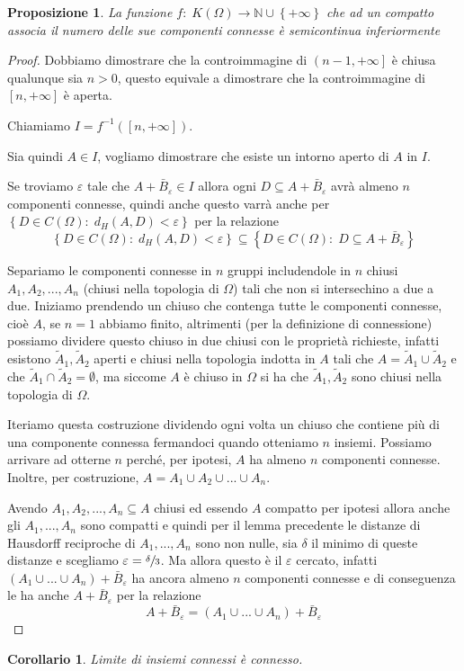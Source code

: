 \documentclass[a4paper,10pt]{article}
\newcounter{counter1}
\theoremstyle{plain}
\newtheorem{mypro}[counter1]{Proposizione}
\newtheorem{mycor}[counter1]{Corollario}
\theoremstyle{definition}
\theoremstyle{remark}
\newcommand{\set}[1]{\left\{#1\right\}}
\newcommand{\pa}[1]{\left(#1\right)}
\newcommand{\bra}[1]{\left[#1\right]}
\begin{document}
\begin{mypro}
  La funzione $f:\; K(\Omega) \rightarrow \mathbb{N} \cup \set{+\infty}$
  che ad un compatto associa il numero delle sue componenti connesse è
  semicontinua inferiormente
\end{mypro}
\begin{proof}
  Dobbiamo dimostrare che la controimmagine di $\left(n-1,
    +\infty\right]$ è chiusa qualunque sia $n>0$, questo equivale a
  dimostrare che la controimmagine di $\bra{n,+\infty}$ è aperta.

  Chiamiamo $I = f^{-1}\pa{\bra{n,+\infty}}$.

  Sia quindi $A \in I$, vogliamo dimostrare che esiste un intorno
  aperto di $A$ in $I$.

  Se troviamo $\varepsilon$ tale che $A + \bar B_{\varepsilon} \in I$
  allora ogni $D \subseteq A + \bar B_{\varepsilon}$ avrà almeno $n$
  componenti connesse, quindi anche questo varrà anche per $\set{D \in
    C(\Omega):\; d_H(A,D) < \varepsilon}$ per la relazione
  \[ \set{D \in C(\Omega):\; d_H(A,D) < \varepsilon} \subseteq \set{D
    \in C(\Omega):\; D \subseteq A + \bar B_{\varepsilon}} \]

  Separiamo le componenti connesse in $n$ gruppi includendole in $n$
  chiusi $A_1,A_2,...,A_n$ (chiusi nella topologia di $\Omega$) tali
  che non si intersechino a due a due. Iniziamo prendendo un chiuso
  che contenga tutte le componenti connesse, cioè $A$, se $n=1$
  abbiamo finito, altrimenti (per la definizione di connessione)
  possiamo dividere questo chiuso in due chiusi con le proprietà
  richieste, infatti esistono $\tilde A_1, \tilde A_2$ aperti e chiusi
  nella topologia indotta in $A$ tali che $A = \tilde A_1 \cup \tilde
  A_2$ e che $\tilde A_1 \cap \tilde A_2 = \emptyset$, ma siccome $A$
  è chiuso in $\Omega$ si ha che $\tilde A_1, \tilde A_2$ sono chiusi
  nella topologia di $\Omega$.

  Iteriamo questa costruzione dividendo ogni volta un chiuso che
  contiene più di una componente connessa fermandoci quando otteniamo
  $n$ insiemi. Possiamo arrivare ad otterne $n$ perché, per ipotesi,
  $A$ ha almeno $n$ componenti connesse. Inoltre, per costruzione, $A
  = A_1 \cup A_2 \cup ... \cup A_n$.

  Avendo $A_1,A_2,..., A_n \subseteq A$ chiusi ed essendo $A$ compatto
  per ipotesi allora anche gli $A_1, ..., A_n$ sono compatti e quindi
  per il lemma precedente le distanze di Hausdorff reciproche di $A_1,
  ..., A_n$ sono non nulle, sia $\delta$ il minimo di queste distanze
  e scegliamo $\varepsilon = \sfrac{\delta}{3}$. Ma allora questo è il
  $\varepsilon$ cercato, infatti $\pa{A_1\cup ... \cup A_n} + \bar B
  _\varepsilon$ ha ancora almeno $n$ componenti connesse e di
  conseguenza le ha anche $A + \bar B_{\varepsilon}$ per la relazione
  \[ A + \bar B_{\varepsilon} = \pa{A_1\cup ... \cup A_n} + \bar
  B_\varepsilon\]
\end{proof}
\begin{mycor}
  Limite di insiemi connessi è connesso.
\end{mycor}
\end{document}
